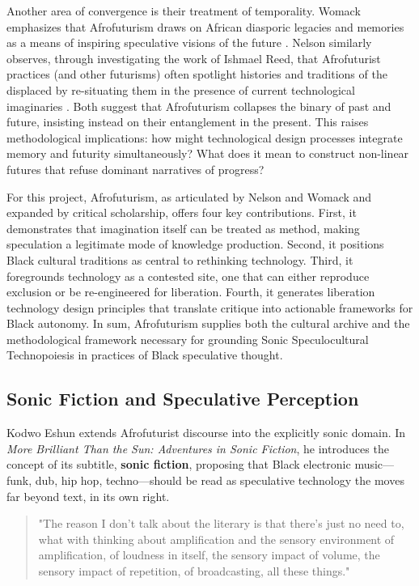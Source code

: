 Another area of convergence is their treatment of temporality. Womack emphasizes that Afrofuturism draws on African diasporic legacies and memories as a means of inspiring speculative visions of the future \parencite{Womack_2013}. Nelson similarly observes, through investigating the work of Ishmael Reed, that Afrofuturist practices (and other futurisms) often spotlight histories and traditions of the displaced by re-situating them in the presence of current technological imaginaries \parencite[8]{Nelson_2002}. Both suggest that Afrofuturism collapses the binary of past and future, insisting instead on their entanglement in the present. This raises methodological implications: how might technological design processes integrate memory and futurity simultaneously? What does it mean to construct non-linear futures that refuse dominant narratives of progress?  

For this project, Afrofuturism, as articulated by Nelson and Womack and expanded by critical scholarship, offers four key contributions. First, it demonstrates that imagination itself can be treated as method, making speculation a legitimate mode of knowledge production. Second, it positions Black cultural traditions as central to rethinking technology. Third, it foregrounds technology as a contested site, one that can either reproduce exclusion or be re-engineered for liberation. Fourth, it generates liberation technology design principles that translate critique into actionable frameworks for Black autonomy. In sum, Afrofuturism supplies both the cultural archive and the methodological framework necessary for grounding Sonic Speculocultural Technopoiesis in practices of Black speculative thought.

\subsection{Sonic Fiction and Speculative Perception}
Kodwo Eshun extends Afrofuturist discourse into the explicitly sonic domain. In \emph{More Brilliant Than the Sun: Adventures in Sonic Fiction}, he introduces the concept of its subtitle, \textbf{sonic fiction}, proposing that Black electronic music—funk, dub, hip hop, techno—should be read as speculative technology the moves far beyond text, in its own right.

\begin{quotation}
	"The reason I don't talk about the literary is that there's just no need to, what with thinking about amplification and the sensory environment of amplification, of loudness in itself, the sensory impact of volume, the sensory impact of repetition, of broadcasting, all these things." \parencite [p. 183]{Eshun_1999}
\end{quotation}

